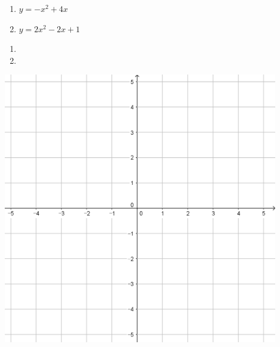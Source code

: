 \documentclass{oblivoir}
\begin{document}
\clearpage
%
\begin{enumerate}\label{grap1}
\item
\(y=-x^2+4x\)
\item
\(y=2x^2-2x+1\)
\end{enumerate}
\begin{mdframed}
\begin{enumerate}
\item
\item
\vspace{0.3\textwidth}
\end{enumerate}
\vspace{0.3\textwidth}
\end{mdframed}
\begin{minipage}{0.49\textwidth}\centering
\par\bigskip\includegraphics[width=0.9\textwidth]{55}
\end{minipage}
\end{document}
